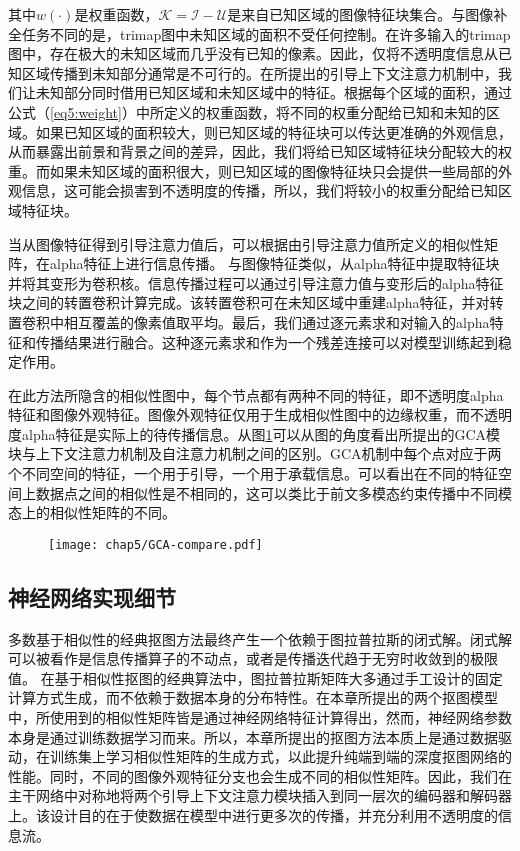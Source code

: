 其中$ w(\cdot)$是权重函数，$ \mathcal{K} = \mathcal{I}-\mathcal{U} $是来自已知区域的图像特征块集合。与图像补全任务不同的是，trimap图中未知区域的面积不受任何控制。在许多输入的trimap图中，存在极大的未知区域而几乎没有已知的像素。因此，仅将不透明度信息从已知区域传播到未知部分通常是不可行的。在所提出的引导上下文注意力机制中，我们让未知部分同时借用已知区域和未知区域中的特征。根据每个区域的面积，通过公式（\ref{eq5:weight}）中所定义的权重函数，将不同的权重分配给已知和未知的区域。如果已知区域的面积较大，则已知区域的特征块可以传达更准确的外观信息，从而暴露出前景和背景之间的差异，因此，我们将给已知区域特征块分配较大的权重。而如果未知区域的面积很大，则已知区域的图像特征块只会提供一些局部的外观信息，这可能会损害到不透明度的传播，所以，我们将较小的权重分配给已知区域特征块。

当从图像特征得到引导注意力值后，可以根据由引导注意力值所定义的相似性矩阵，在alpha特征上进行信息传播。
与图像特征类似，从alpha特征中提取特征块并将其变形为卷积核。信息传播过程可以通过引导注意力值与变形后的alpha特征块之间的转置卷积计算完成。该转置卷积可在未知区域中重建alpha特征，并对转置卷积中相互覆盖的像素值取平均。最后，我们通过逐元素求和对输入的alpha特征和传播结果进行融合。这种逐元素求和作为一个残差连接可以对模型训练起到稳定作用。

在此方法所隐含的相似性图中，每个节点都有两种不同的特征，即不透明度alpha特征和图像外观特征。图像外观特征仅用于生成相似性图中的边缘权重，而不透明度alpha特征是实际上的待传播信息。从图\ref{fig5:gca_comp}可以从图的角度看出所提出的GCA模块与上下文注意力机制及自注意力机制之间的区别。GCA机制中每个点对应于两个不同空间的特征，一个用于引导，一个用于承载信息。可以看出在不同的特征空间上数据点之间的相似性是不相同的，这可以类比于前文多模态约束传播中不同模态上的相似性矩阵的不同。

\begin{figure}[t]
	\centering
	\texttt{[image: chap5/GCA-compare.pdf]}
	\label{fig5:gca_comp}
\end{figure}

\subsection{神经网络实现细节}
多数基于相似性的经典抠图方法最终产生一个依赖于图拉普拉斯的闭式解\cite{levin2008closed,lee2011nonlocal,chen2013knn}。闭式解可以被看作是信息传播算子的不动点，或者是传播迭代趋于无穷时收敛到的极限值\cite{zhou2004learning}。
在基于相似性抠图的经典算法中，图拉普拉斯矩阵大多通过手工设计的固定计算方式生成，而不依赖于数据本身的分布特性。在本章所提出的两个抠图模型中，所使用到的相似性矩阵皆是通过神经网络特征计算得出，然而，神经网络参数本身是通过训练数据学习而来。所以，本章所提出的抠图方法本质上是通过数据驱动，在训练集上学习相似性矩阵的生成方式，以此提升纯端到端的深度抠图网络的性能。同时，不同的图像外观特征分支也会生成不同的相似性矩阵。因此，我们在主干网络中对称地将两个引导上下文注意力模块插入到同一层次的编码器和解码器上。该设计目的在于使数据在模型中进行更多次的传播，并充分利用不透明度的信息流。

